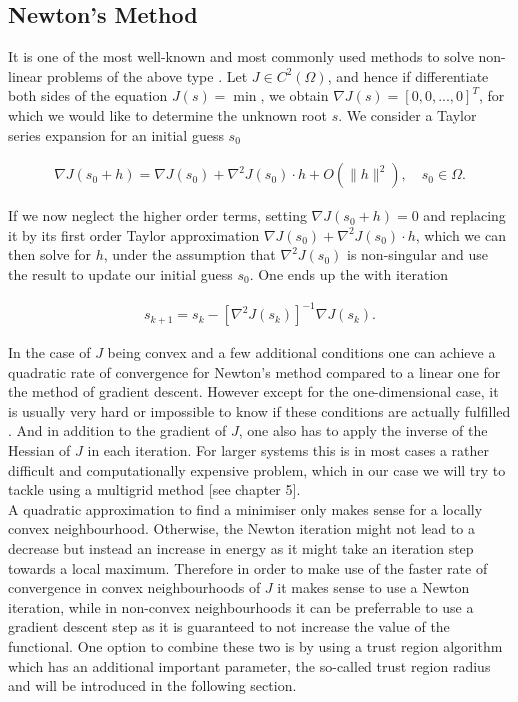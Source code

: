 \documentclass[../draft_1.tex]{subfiles}
\begin{document}
\subsection{Newton's Method}
It is one of the most well-known and most commonly used methods to solve non-linear problems of the above type \cite{briggs2000multigrid}. Let $J \in C^2(\Omega)$, and hence if differentiate both sides of the equation $J(s) = \min$, we obtain $\nabla J(s) =  [0, 0, ..., 0]^T$, for which we would like to determine the unknown root $s$. We consider a Taylor series expansion for an initial guess $s_0$
\begin{ceqn}
\begin{equation}
\begin{aligned}
\nabla J(s_0 + h) = \nabla J(s_0) + \nabla^2 J(s_0) \cdot h + O(\|h\|^2), \quad s_0 \in \Omega.
\end{aligned}
\end{equation}
\end{ceqn}
If we now neglect the higher order terms, setting $\nabla J(s_0+h) = 0$ and replacing it by its first order Taylor approximation $\nabla J(s_0) + \nabla^2 J(s_0) \cdot h$, which we can then solve for $h$, under the assumption that $\nabla^2 J(s_0)$ is non-singular and use the result to update our initial guess $s_0$.  One ends up the with iteration 

\begin{ceqn}
\begin{equation}
\begin{aligned}
s_{k+1} = s_k - [\nabla^2 J(s_k)]^{-1} \nabla J (s_k). 
\end{aligned}
\end{equation}
\end{ceqn}

In the case of $J$ being convex and a few additional conditions one can achieve a quadratic rate of convergence for Newton's method compared to a linear one for the method of gradient descent. However except for the one-dimensional case, it is usually very hard or impossible to know if these conditions are actually fulfilled \cite{deuflhard2011newton}. And in addition to the gradient of $J$, one also has to apply the inverse of the Hessian of $J$ in each iteration. For larger systems this is in most cases a rather difficult and computationally expensive problem, which in our case we will try to tackle using a multigrid method [see chapter 5]. 
\smallskip
\\
A quadratic approximation to find a minimiser only makes sense for a locally convex neighbourhood.  Otherwise, the Newton iteration might not lead to a decrease but instead an increase in energy as it might take an iteration step towards a local maximum. Therefore in order to make use of the faster rate of convergence in convex neighbourhoods of $J$ it makes sense to use a Newton iteration, while in non-convex neighbourhoods it can be preferrable to use a gradient descent step as it is guaranteed to not increase the value of the functional. One option to combine these two is by using a trust region algorithm which has an additional important parameter, the so-called trust region radius and will be introduced in the following section.
\end{document}
